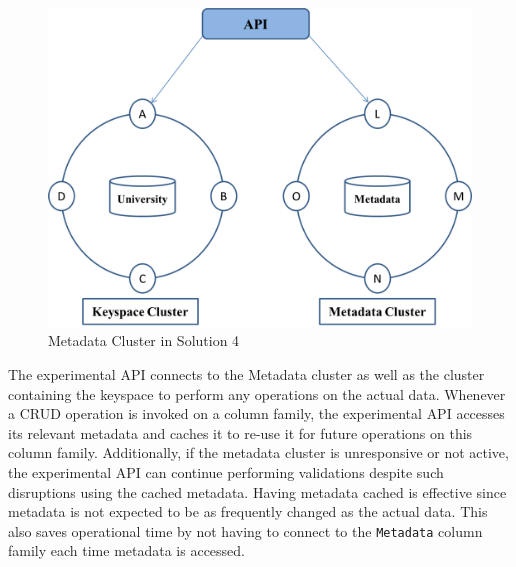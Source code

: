 \begin{figure}[h]
	\centering
	\includegraphics[width=.6\textwidth]{./figure/Solutions/Sol4-cluster-pic.png}
	\caption{Metadata Cluster in Solution
	4}\label{fd:MetadataCluster-Solution4}
	
\end{figure}
 The experimental \ac{API} connects to the Metadata cluster as well as
the cluster containing the keyspace to perform any operations on the actual
data.  Whenever a \ac{CRUD} operation is invoked on a column family,  the
experimental \ac{API} accesses its relevant metadata and caches it to re-use it
for future operations on this column family. 
Additionally, if the metadata cluster is unresponsive or not active,  the
experimental \ac{API} can continue performing validations despite such
disruptions using the cached metadata.
Having metadata cached is effective since metadata is not
expected to be as frequently changed as the actual data.  This also saves
operational time by not having to connect to the
\texttt{Metadata} column family each time  metadata is accessed. 




